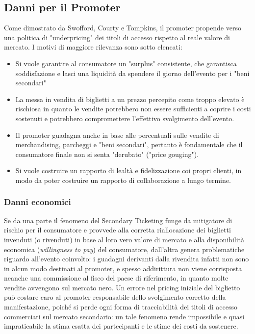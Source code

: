 \subsection{Danni per il Promoter}
Come dimostrato da Swofford, Courty e Tompkins, il promoter propende verso una politica di "underpricing" dei titoli di accesso rispetto al reale valore di mercato. I motivi di maggiore rilevanza sono sotto elencati: 
\begin{itemize}
\item Si vuole garantire al consumatore un "surplus" consistente, che garantisca soddisfazione e lasci una liquidità da spendere il giorno dell'evento per i "beni secondari"
\item La messa in vendita di biglietti a un prezzo percepito come troppo elevato è rischiosa in quanto le vendite potrebbero non essere sufficienti a coprire i costi sostenuti e potrebbero compromettere l'effettivo svolgimento dell'evento. 
\item Il promoter guadagna anche in base alle percentuali sulle vendite di merchandising, parcheggi e "beni secondari", pertanto è fondamentale che il consumatore finale non si senta "derubato" ("price gouging").
\item Si vuole costruire un rapporto di lealtà e fidelizzazione coi propri clienti, in modo da poter costruire un rapporto di collaborazione a lungo termine.
\end{itemize}
\subsubsection{Danni economici}
Se da una parte il fenomeno del Secondary Ticketing funge da mitigatore di rischio \cite{geloso2014ticket} per il consumatore e provvede alla corretta riallocazione dei biglietti invenduti (o rivenduti) in base al loro vero valore di mercato e alla disponibilità economica (\textit{willingness to pay}) del consumatore, dall'altra genera problematiche riguardo all'evento coinvolto: i guadagni derivanti dalla rivendita infatti non sono in alcun modo destinati al promoter, e spesso addirittura non viene corrisposta neanche una commissione al fisco del paese di riferimento, in quanto molte vendite avvengono sul mercato nero. 
Un errore nel pricing iniziale del biglietto può costare caro al promoter responsabile dello svolgimento corretto della manifestazione, poiché si perde ogni forma di tracciabilità dei titoli di accesso commerciati sul mercato secondario: un tale fenomeno rende impossibile e quasi impraticabile la stima esatta dei partecipanti e le stime dei costi da sostenere.
